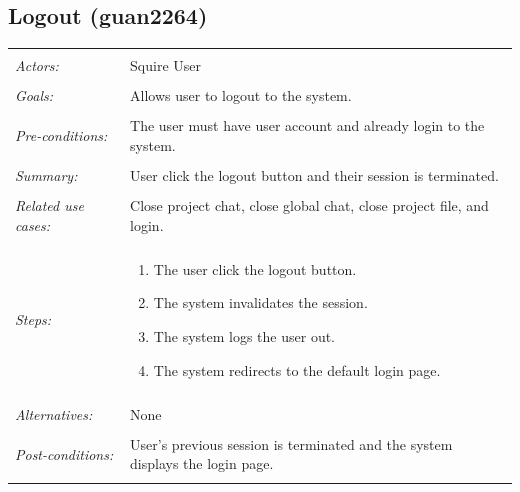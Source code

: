 \documentclass[11pt]{report}
\begin{document}
\begin{IDE-like Features}
\begin{}
\begin{Collaborative features that would be "nice":}
\subsection{Logout (guan2264)}
\begin{tabular}{ p{2cm} p{12cm} }
 \hline
 \\
 \textit{Actors:} & Squire User \\ 
 \\
 \textit{Goals:} & Allows user to logout to the system. \\
 \\
 \textit{Pre-conditions:} & The user must have user account and already login to the system. \\
 \\
 \textit{Summary:} & User click the logout button and their session is terminated. \\ 
 \\
 \textit{Related use cases:} & Close project chat, close global chat, close project file, and login. \\ 
 \\
 \textit{Steps:} & \begin{enumerate}
  \item The user click the logout button.
  \item The system invalidates the session.
  \item The system logs the user out.
  \item The system redirects to the default login page.
 \end{enumerate} \\
 \\
 \textit{Alternatives:} & None\\
 \\
 \textit{Post-conditions:} & User's previous session is terminated and the system displays the login page. \\
 \\
\hline
\end{tabular}


\end{Collaborative features that would be "nice":}
\end{}
\end{IDE-like Features}
\end{document}

